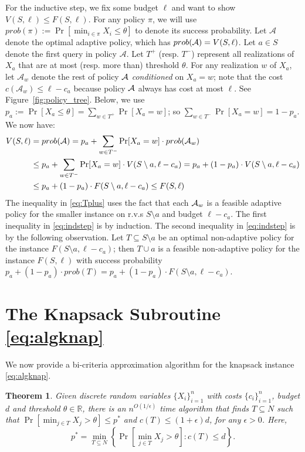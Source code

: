 \documentclass[11pt]{article}
\newtheorem{thm}{Theorem}[section]
\theoremstyle{remark}
\theoremstyle{plain}
\theoremstyle{remark}
\begin{document}
For the inductive step,  we fix some budget $\ell$ and want to show $V(S,\ell ) \leq F(S,\ell)$.  For any policy $\pi$, we will use $prob(\pi):=\Pr[\min_{i\in \pi} X_i\le \theta]$ to denote its success probability.  Let  $\mathcal{A}$
denote the optimal adaptive policy, which has $prob({\cal A}) = V(S,\ell )$. Let $a\in S$ denote the first query in policy  $\mathcal{A}$. Let $T^+$ (resp. $T^-$) represent all realizations of $X_a$ that are at most (resp. more than)  threshold $\theta$. For any realization $w$ of $X_a$, let $\mathcal{A}_w$ denote the rest of  policy ${\cal A}$ {\em conditioned} on $X_a=w$; note that the cost $c(\mathcal{A}_w)\le \ell - c_a$ because policy ${\cal A}$ always has cost at most $\ell$. See Figure~\ref{fig:policy_tree}.  Below, we use $p_a:=\Pr[X_a \le \theta]=\sum_{w\in T^+} \Pr[X_a=w]$; so $\sum_{w\in T^-} \Pr[X_a=w]=1-p_a$. We now have:
\begin{align} 
    V(S,\ell) & =  prob({\cal A}) =  p_a + \sum_{w \in T^-} \Pr[X_a = w] \cdot prob({\cal A}_w)  \notag\\
    & \le  p_a + \sum_{w \in T^-} \Pr[ X_a = w] \cdot V(S \setminus a, \ell - c_a) =  p_a + (1- p_a)\cdot V(S \setminus a, \ell - c_a)   \label{eq:Tplus}\\
     & \leq    p_a + (1 - p_a)\cdot F(S \setminus a, \ell - c_a)  \leq F(S, \ell) \label{eq:indstep}
     \end{align}
The inequality in \eqref{eq:Tplus} uses the fact that each ${\cal A}_w$ is a feasible adaptive policy for the smaller instance on r.v.s $S\setminus a$ and budget $\ell-c_a$. The first inequality in  \eqref{eq:indstep} is by induction. The second inequality in  \eqref{eq:indstep} is by the following observation. Let $T\subseteq S\setminus a$  be an optimal non-adaptive policy for the instance $F(S \setminus a, \ell - c_a)$; then $T\cup a$ is a feasible non-adaptive policy for the instance $F(S,\ell)$ with success probability $p_a + (1-p_a)\cdot prob(T)= p_a + (1 - p_a)\cdot F(S \setminus a, \ell - c_a) $.   


\section{The  Knapsack  Subroutine \texorpdfstring{\eqref{eq:algknap}}{(algknap)}}
\label{app:knapsack}

We now provide a bi-criteria approximation algorithm for the knapsack instance \eqref{eq:algknap}. 
\begin{thm}
\label{thm:knapsack}
    Given discrete random variables  $\{X_i\}_{i=1}^n$ with costs $\{c_i\}_{i=1}^n$, budget $d$ and  threshold $\theta \in \mathbb{R}$, there is an $n^{O(1/\epsilon)}$  time algorithm that finds $T \subseteq N$ such that  $ \Pr\left[ \min_{j \in T} X_j   > \theta \right]\le  p^*$ and $c(T) \leq (1+\epsilon)d$, for any $\epsilon>0$. Here, 
    \[
      p^* = \min_{T \subseteq N } \left\{ \Pr\left[ \min_{j \in T} X_j  > \theta \right] : c(T) \leq d \right\}. \tag{*} \label{KP}
    \]
\end{thm}
\end{document}
